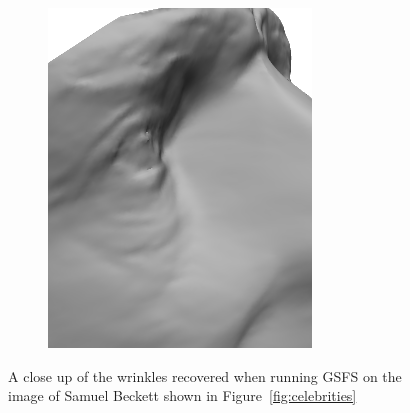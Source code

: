 \begin{figure}
\begin{subfigure}{0.4\textwidth}
        \includegraphics[width=\textwidth]{statistical_normals/images/gsfs_results/celebrities/samuel_beckett_spherical_wrinkles.png}
    \end{subfigure}
    \caption{A close up of the wrinkles recovered when running GSFS on the 
             image of Samuel Beckett shown in Figure~\ref{fig:celebrities}}
\label{fig:samuel-beckett-wrinkles}
\end{figure}
